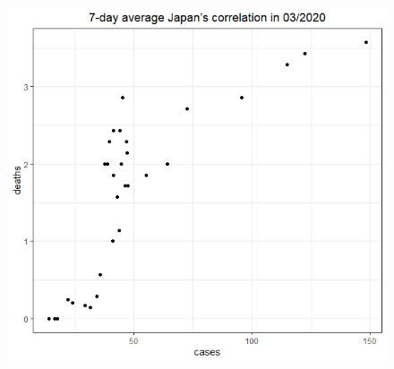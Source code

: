 \documentclass[english,10pt,table]{beamer}
\begin{document}
{\begin{figure}[H]
\begin{center}
        \includegraphics[scale = 0.2]{ix/ix.3/JPN_03_2020.png}
    \end{center}
    \end{figure}
}
\end{document}
